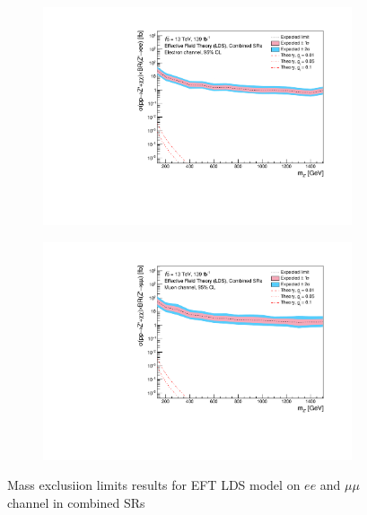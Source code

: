 \documentclass[12pt, a4paper]{book}
\begin{document}
\begin{figure}[!ht]
	\centering
	\begin{subfigure}[b]{0.49\textwidth}
      \centering
      \includegraphics[width=1\textwidth]{Limits/Model_independent/EFT_LDS/mass_exclusion_ee.pdf}
   \end{subfigure}
   \hfill
   \begin{subfigure}[b]{0.49\textwidth}
      \centering
      \includegraphics[width=1\textwidth]{Limits/Model_independent/EFT_LDS/mass_exclusion_uu.pdf}
   \end{subfigure}
   \caption{Mass exclusiion limits results for EFT LDS model on $ee$ and $\mu\mu$ channel in combined SRs}\label{fig:EFT_LDS_me_comb}
\end{figure}

\clearpage
\end{document}
